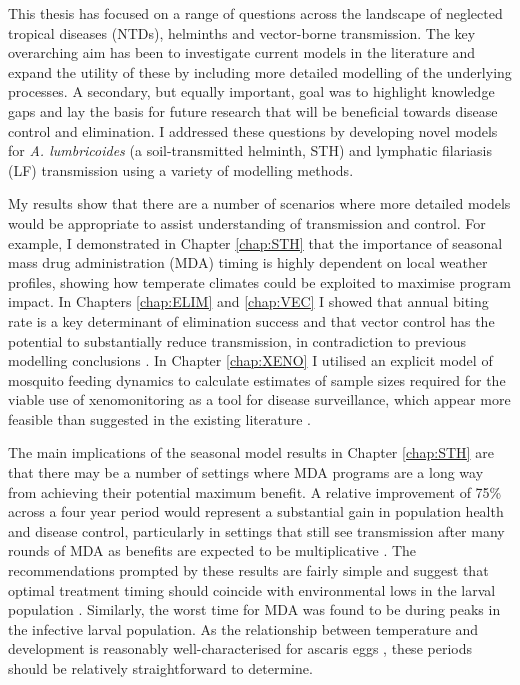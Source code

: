 
This thesis has focused on a range of questions across the landscape of neglected tropical diseases (NTDs), helminths and vector-borne transmission. The key overarching aim has been to investigate current models in the literature and expand the utility of these by including more detailed modelling of the underlying processes. A secondary, but equally important, goal was to highlight knowledge gaps and lay the basis for future research that will be beneficial towards disease control and elimination. I addressed these questions by developing novel models for \textit{A. lumbricoides} (a soil-transmitted helminth, STH) and lymphatic filariasis (LF) transmission using a variety of modelling methods. 

My results show that there are a number of scenarios where more detailed models would be appropriate to assist understanding of transmission and control. For example, I demonstrated in Chapter \ref{chap:STH} that the importance of seasonal mass drug administration (MDA) timing is highly dependent on local weather profiles, showing how temperate climates could be exploited to maximise program impact. In Chapters \ref{chap:ELIM} and \ref{chap:VEC} I showed that annual biting rate is a key determinant of elimination success and that vector control has the potential to substantially reduce transmission, in contradiction to previous modelling conclusions \cite{Irvine2017_Tripledrug}. In Chapter \ref{chap:XENO} I utilised an explicit model of mosquito feeding dynamics to calculate estimates of sample sizes required for the viable use of xenomonitoring as a tool for disease surveillance, which appear more feasible than suggested in the existing literature \cite{Schmaedick2014}.

The main implications of the seasonal model results in Chapter \ref{chap:STH} are that there may be a number of settings where MDA programs are a long way from achieving their potential maximum benefit. A relative improvement of 75\% across a four year period would represent a substantial gain in population health and disease control, particularly in settings that still see transmission after many rounds of MDA as benefits are expected to be multiplicative \cite{WHO2005_LF}. The recommendations prompted by these results are fairly simple and suggest that optimal treatment timing should coincide with environmental lows in the larval population \cite{Davis2018}. Similarly, the worst time for MDA was found to be during peaks in the infective larval population. As the relationship between temperature and development is reasonably well-characterised for ascaris eggs \cite{Wagner}, these periods should be relatively straightforward to determine.

